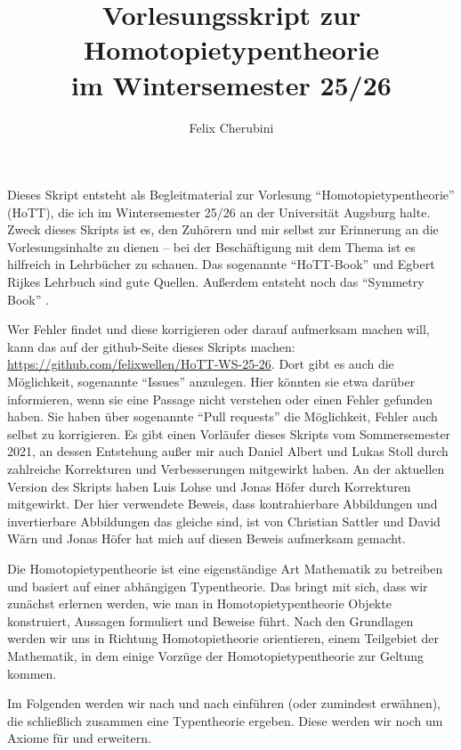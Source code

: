 \documentclass{../util/hott}
\title{Vorlesungsskript zur Homotopietypentheorie \\ im Wintersemester 25/26}
\author{Felix Cherubini}
\begin{document}
\maketitle

\tableofcontents
 \pagebreak
Dieses Skript entsteht als Begleitmaterial zur Vorlesung ``Homotopietypentheorie'' (HoTT), die ich im Wintersemester 25/26 an der Universität Augsburg halte.
Zweck dieses Skripts ist es, den Zuhörern und mir selbst zur Erinnerung an die Vorlesungsinhalte zu dienen --
bei der Beschäftigung mit dem Thema ist es hilfreich in Lehrbücher zu schauen.
Das sogenannte ``HoTT-Book''\cite{hott} und Egbert Rijkes Lehrbuch \cite{rijke} sind gute Quellen.
Außerdem entsteht noch das ``Symmetry Book'' \cite{Sym}.

Wer Fehler findet und diese korrigieren oder darauf aufmerksam machen will, kann das auf der github-Seite dieses Skripts machen:
\href{https://github.com/felixwellen/HoTT-WS-25-26}{https://github.com/felixwellen/HoTT-WS-25-26}.
Dort gibt es auch die Möglichkeit, sogenannte ``Issues'' anzulegen.
Hier könnten sie etwa darüber informieren, wenn sie eine Passage nicht verstehen oder einen Fehler gefunden haben.
Sie haben über sogenannte ``Pull requests'' die Möglichkeit, Fehler auch selbst zu korrigieren.
Es gibt einen Vorläufer dieses Skripts vom Sommersemester 2021, an dessen Entstehung außer mir auch Daniel Albert und Lukas Stoll durch zahlreiche Korrekturen und Verbesserungen mitgewirkt haben.
An der aktuellen Version des Skripts haben Luis Lohse und Jonas Höfer durch Korrekturen mitgewirkt.
Der hier verwendete Beweis, dass kontrahierbare Abbildungen und invertierbare Abbildungen das gleiche sind, ist von Christian Sattler und David Wärn und Jonas Höfer hat mich auf diesen Beweis aufmerksam gemacht. 

Die Homotopietypentheorie ist eine eigenständige Art Mathematik zu betreiben und basiert auf einer abhängigen Typentheorie.
Das bringt mit sich, dass wir zunächst erlernen werden, wie man in Homotopietypentheorie Objekte konstruiert, Aussagen formuliert und Beweise führt.
Nach den Grundlagen werden wir uns in Richtung Homotopietheorie orientieren, einem Teilgebiet der Mathematik, in dem einige Vorzüge der Ho\-mo\-to\-pie\-ty\-pen\-theo\-rie zur Geltung kommen.

Im Folgenden werden wir nach und nach  einführen (oder zumindest erwähnen), die schließlich zusammen eine Typentheorie ergeben.
Diese werden wir noch um Axiome für  und  erweitern.
\end{document}
